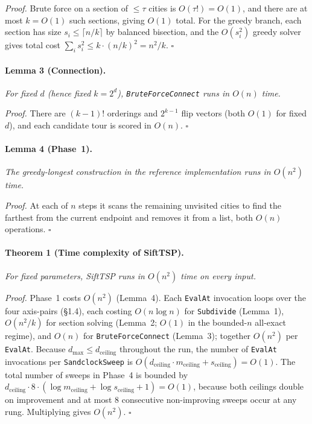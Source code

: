 \documentclass[11pt,a4paper]{article}
\begin{document}
\textit{Proof.} Brute force on a section of $\leq \tau$ cities is
$O(\tau!) = O(1)$, and there are at most $k = O(1)$ such sections,
giving $O(1)$ total. For the greedy branch, each section has size
$s_i \leq \lceil n/k \rceil$ by balanced bisection, and the $O(s_i^2)$
greedy solver gives total cost $\sum_i s_i^2 \leq k \cdot (n/k)^2 = n^2/k$.
$\square$

\paragraph{Lemma 3 (Connection).} \textit{For fixed $d$ (hence fixed
$k = 2^d$), \texttt{BruteForceConnect} runs in $O(n)$ time.}

\textit{Proof.} There are $(k-1)!$ orderings and $2^{k-1}$ flip vectors
(both $O(1)$ for fixed $d$), and each candidate tour is scored in
$O(n)$. $\square$

\paragraph{Lemma 4 (Phase~1).} \textit{The greedy-longest construction
in the reference implementation runs in $O(n^2)$ time.}

\textit{Proof.} At each of $n$ steps it scans the remaining unvisited
cities to find the farthest from the current endpoint and removes it
from a list, both $O(n)$ operations. $\square$

\paragraph{Theorem 1 (Time complexity of SiftTSP).} \textit{For fixed
parameters, SiftTSP runs in $O(n^2)$ time on every input.}

\textit{Proof.} Phase~1 costs $O(n^2)$ (Lemma~4). Each \texttt{EvalAt}
invocation loops over the four axis-pairs (\S1.4), each costing
$O(n \log n)$ for \texttt{Subdivide} (Lemma~1), $O(n^2/k)$ for section
solving (Lemma~2; $O(1)$ in the bounded-$n$ all-exact regime), and
$O(n)$ for \texttt{BruteForceConnect} (Lemma~3); together $O(n^2)$ per
\texttt{EvalAt}. Because $d_{\max} \leq d_{\text{ceiling}}$ throughout
the run, the number of \texttt{EvalAt} invocations per
\texttt{SandclockSweep} is
$O(d_{\text{ceiling}} \cdot m_{\text{ceiling}} + s_{\text{ceiling}}) = O(1)$.
The total number of sweeps in Phase~4 is bounded by
$d_{\text{ceiling}} \cdot 8 \cdot (\log m_{\text{ceiling}} + \log s_{\text{ceiling}} + 1) = O(1)$,
because both ceilings double on improvement and at most 8 consecutive
non-improving sweeps occur at any rung. Multiplying gives $O(n^2)$.
$\square$
\end{document}
